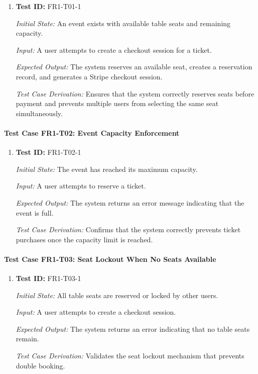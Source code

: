 \documentclass[12pt, titlepage]{article}
\begin{document}
\begin{enumerate}

\item \textbf{Test ID:} FR1-T01-1

\textit{Initial State:} An event exists with available table seats and remaining capacity.

\textit{Input:} A user attempts to create a checkout session for a ticket.

\textit{Expected Output:} The system reserves an available seat, creates a reservation record, and generates a Stripe checkout session.

\textit{Test Case Derivation:} Ensures that the system correctly reserves seats before payment and prevents multiple users from selecting the same seat simultaneously.

\end{enumerate}


\paragraph{Test Case FR1-T02: Event Capacity Enforcement}

\begin{enumerate}

\item \textbf{Test ID:} FR1-T02-1

\textit{Initial State:} The event has reached its maximum capacity.

\textit{Input:} A user attempts to reserve a ticket.

\textit{Expected Output:} The system returns an error message indicating that the event is full.

\textit{Test Case Derivation:} Confirms that the system correctly prevents ticket purchases once the capacity limit is reached.

\end{enumerate}


\paragraph{Test Case FR1-T03: Seat Lockout When No Seats Available}

\begin{enumerate}

\item \textbf{Test ID:} FR1-T03-1

\textit{Initial State:} All table seats are reserved or locked by other users.

\textit{Input:} A user attempts to create a checkout session.

\textit{Expected Output:} The system returns an error indicating that no table seats remain.

\textit{Test Case Derivation:} Validates the seat lockout mechanism that prevents double booking.

\end{enumerate}
\end{document}
